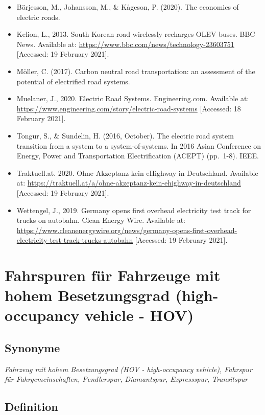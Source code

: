 \documentclass[
]{book}
\providecommand{\tightlist}{%
  \setlength{\itemsep}{0pt}\setlength{\parskip}{0pt}}
\begin{document}
\begin{itemize}
\tightlist
\item
  Börjesson, M., Johansson, M., \& Kågeson, P. (2020). The economics of electric roads.
\item
  Kelion, L., 2013. South Korean road wirelessly recharges OLEV buses. BBC News. Available at: \url{https://www.bbc.com/news/technology-23603751} {[}Accessed: 19 February 2021{]}.
\item
  Möller, C. (2017). Carbon neutral road transportation: an assessment of the potential of electrified road systems.
\item
  Muelaner, J., 2020. Electric Road Systems. Engineering.com. Available at: \url{https://www.engineering.com/story/electric-road-systems} {[}Accessed: 18 February 2021{]}.
\item
  Tongur, S., \& Sundelin, H. (2016, October). The electric road system transition from a system to a system-of-systems. In 2016 Asian Conference on Energy, Power and Transportation Electrification (ACEPT) (pp.~1-8). IEEE.
\item
  Traktuell.at. 2020. Ohne Akzeptanz kein eHighway in Deutschland. Available at: \url{https://traktuell.at/a/ohne-akzeptanz-kein-ehighway-in-deutschland} {[}Accessed: 19 February 2021{]}.
\item
  Wettengel, J., 2019. Germany opens first overhead electricity test track for trucks on autobahn. Clean Energy Wire. Available at: \url{https://www.cleanenergywire.org/news/germany-opens-first-overhead-electricity-test-track-trucks-autobahn} {[}Accessed: 19 February 2021{]}.
\end{itemize}

\hypertarget{high_occupancy}{%
\section{Fahrspuren für Fahrzeuge mit hohem Besetzungsgrad (high-occupancy vehicle - HOV)}\label{high_occupancy}}

\hypertarget{synonyme-4}{%
\subsection*{Synonyme}\label{synonyme-4}}

\emph{Fahrzeug mit hohem Besetzungsgrad (HOV - high-occupancy vehicle), Fahrspur für Fahrgemeinschaften, Pendlerspur, Diamantspur, Expressspur, Transitspur}

\hypertarget{definition-4}{%
\subsection*{Definition}\label{definition-4}}
\end{document}
